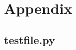 \chapter{Appendix}

% 


\newpage
\section*{testfile.py} \label{appendix:programTest}
    \inputminted[firstline=2, lastline=12]{python}{appendix/test_file.py}
